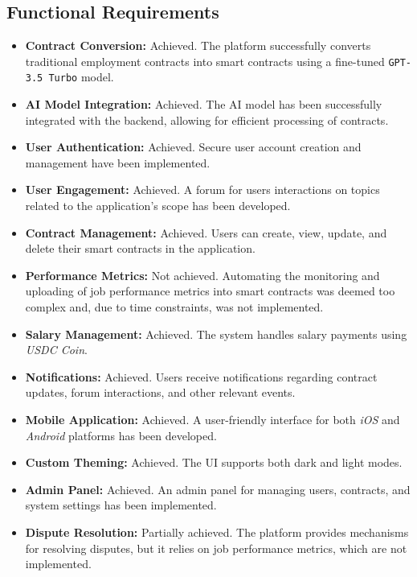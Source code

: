 \subsection{Functional Requirements}

\begin{itemize}
    \item \textbf{Contract Conversion:} Achieved. The platform successfully converts traditional employment contracts into smart contracts using a fine-tuned \texttt{GPT-3.5 Turbo} model.
    \item \textbf{AI Model Integration:} Achieved. The AI model has been successfully integrated with the backend, allowing for efficient processing of contracts.
    \item \textbf{User Authentication:} Achieved. Secure user account creation and management have been implemented.
    \item \textbf{User Engagement:} Achieved. A forum for users interactions on topics related to the application's scope has been developed.
    \item \textbf{Contract Management:} Achieved. Users can create, view, update, and delete their smart contracts in the application.
    \item \textbf{Performance Metrics:} Not achieved. Automating the monitoring and uploading of job performance metrics into smart contracts was deemed too complex and, due to time constraints, was not implemented. %
    \item \textbf{Salary Management:} Achieved. The system handles salary payments using \textit{USDC Coin}.
    \item \textbf{Notifications:} Achieved. Users receive notifications regarding contract updates, forum interactions, and other relevant events.
    \item \textbf{Mobile Application:} Achieved. A user-friendly interface for both \textit{iOS} and \textit{Android} platforms has been developed.
    \item \textbf{Custom Theming:} Achieved. The UI supports both dark and light modes.
    \item \textbf{Admin Panel:} Achieved. An admin panel for managing users, contracts, and system settings has been implemented.
    \item \textbf{Dispute Resolution:} Partially achieved. The platform provides mechanisms for resolving disputes, but it relies on job performance metrics, which are not implemented.
\end{itemize}

